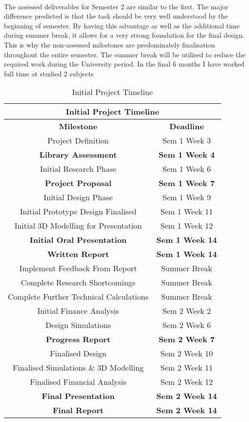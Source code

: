 \paragraph{}
The assessed deliverables for Semester 2 are similar to the first. The major difference predicted is that the task should be very well understood by the beginning of semester. By having this advantage as well as the additional time during summer break, it allows for a very strong foundation for the final design. This is why the non-assessed milestones are predominately finalisation throughout the entire semester. The summer break will be utilised to reduce the required work during the University period. In the final 6 months I have worked full time at studied 2 subjects 

\begin{table}[H]
\centering
\begin{tabular}{||c c||} 
 \hline
 \multicolumn{2}{|c|}{\textbf{Initial Project Timeline}} \\ [0.5ex] 
 \hline\hline
 \textbf{Milestone} & \textbf{Deadline} \\ 
 \hline\hline
 Project Definition 						& Sem 1 Week 3 \\ 
 \textbf{Library Assessment} 				& \textbf{Sem 1 Week 4} \\
 Initial Research Phase 					& Sem 1 Week 6 \\
 \textbf{Project Proposal} 					& \textbf{Sem 1 Week 7} \\
 Initial Design Phase 						& Sem 1 Week 9 \\
 Initial Prototype Design Finalised 		& Sem 1 Week 11 \\
 Initial 3D Modelling for Presentation 		& Sem 1 Week 12 \\
 \textbf{Initial Oral Presentation} 		& \textbf{Sem 1 Week 14} \\ 
 \textbf{Written Report} 					& \textbf{Sem 1 Week 14} \\ 
 Implement Feedback From Report 			& Summer Break \\
 Complete Research Shortcomings 			& Summer Break \\
 Complete Further Technical Calculations 	& Summer Break \\
 Initial Finance Analysis 					& Sem 2 Week 2 \\
 Design Simulations 						& Sem 2 Week 6 \\
 \textbf{Progress Report} 					& \textbf{Sem 2 Week 7} \\
 Finalised Design 							& Sem 2 Week 10 \\
 Finalised Simulations \& 3D Modelling 		& Sem 2 Week 11 \\
 Finalised Financial Analysis				& Sem 2 Week 12 \\
 \textbf{Final Presentation} 				& \textbf{Sem 2 Week 14} \\
 \textbf{Final Report} 						& \textbf{Sem 2 Week 14} \\ [1ex] 
 \hline
\end{tabular}
\caption{Initial Project Timeline}
\label{table:milestones_1}
\end{table}    

